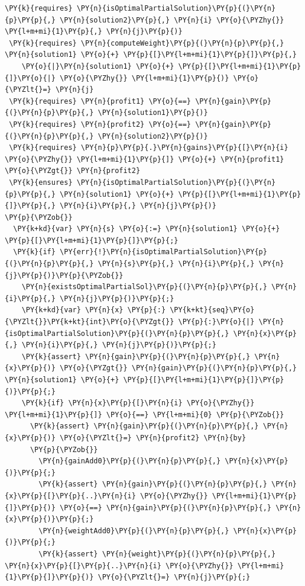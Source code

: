 \begin{sloppypar}
\begin{enumerate}
\begin{Verbatim}[commandchars=\\\{\}]
 \PY{k}{requires} \PY{n}{isOptimalPartialSolution}\PY{p}{(}\PY{n}{p}\PY{p}{,} \PY{n}{solution2}\PY{p}{,} \PY{n}{i} \PY{o}{\PYZhy{}} \PY{l+m+mi}{1}\PY{p}{,} \PY{n}{j}\PY{p}{)}
 \PY{k}{requires} \PY{n}{computeWeight}\PY{p}{(}\PY{n}{p}\PY{p}{,} \PY{n}{solution1} \PY{o}{+} \PY{p}{[}\PY{l+m+mi}{1}\PY{p}{]}\PY{p}{,} 
    \PY{o}{|}\PY{n}{solution1} \PY{o}{+} \PY{p}{[}\PY{l+m+mi}{1}\PY{p}{]}\PY{o}{|} \PY{o}{\PYZhy{}} \PY{l+m+mi}{1}\PY{p}{)} \PY{o}{\PYZlt{}=} \PY{n}{j}
 \PY{k}{requires} \PY{n}{profit1} \PY{o}{==} \PY{n}{gain}\PY{p}{(}\PY{n}{p}\PY{p}{,} \PY{n}{solution1}\PY{p}{)}
 \PY{k}{requires} \PY{n}{profit2} \PY{o}{==} \PY{n}{gain}\PY{p}{(}\PY{n}{p}\PY{p}{,} \PY{n}{solution2}\PY{p}{)}
 \PY{k}{requires} \PY{n}{p}\PY{p}{.}\PY{n}{gains}\PY{p}{[}\PY{n}{i} \PY{o}{\PYZhy{}} \PY{l+m+mi}{1}\PY{p}{]} \PY{o}{+} \PY{n}{profit1} \PY{o}{\PYZgt{}} \PY{n}{profit2}
 \PY{k}{ensures} \PY{n}{isOptimalPartialSolution}\PY{p}{(}\PY{n}{p}\PY{p}{,} \PY{n}{solution1} \PY{o}{+} \PY{p}{[}\PY{l+m+mi}{1}\PY{p}{]}\PY{p}{,} \PY{n}{i}\PY{p}{,} \PY{n}{j}\PY{p}{)}
\PY{p}{\PYZob{}}
  \PY{k+kd}{var} \PY{n}{s} \PY{o}{:=} \PY{n}{solution1} \PY{o}{+} \PY{p}{[}\PY{l+m+mi}{1}\PY{p}{]}\PY{p}{;}
  \PY{k}{if} \PY{err}{!}\PY{n}{isOptimalPartialSolution}\PY{p}{(}\PY{n}{p}\PY{p}{,} \PY{n}{s}\PY{p}{,} \PY{n}{i}\PY{p}{,} \PY{n}{j}\PY{p}{)}\PY{p}{\PYZob{}}
    \PY{n}{existsOptimalPartialSol}\PY{p}{(}\PY{n}{p}\PY{p}{,} \PY{n}{i}\PY{p}{,} \PY{n}{j}\PY{p}{)}\PY{p}{;}
    \PY{k+kd}{var} \PY{n}{x} \PY{p}{:} \PY{k+kt}{seq}\PY{o}{\PYZlt{}}\PY{k+kt}{int}\PY{o}{\PYZgt{}} \PY{p}{:}\PY{o}{|} \PY{n}{isOptimalPartialSolution}\PY{p}{(}\PY{n}{p}\PY{p}{,} \PY{n}{x}\PY{p}{,} \PY{n}{i}\PY{p}{,} \PY{n}{j}\PY{p}{)}\PY{p}{;}
    \PY{k}{assert} \PY{n}{gain}\PY{p}{(}\PY{n}{p}\PY{p}{,} \PY{n}{x}\PY{p}{)} \PY{o}{\PYZgt{}} \PY{n}{gain}\PY{p}{(}\PY{n}{p}\PY{p}{,} \PY{n}{solution1} \PY{o}{+} \PY{p}{[}\PY{l+m+mi}{1}\PY{p}{]}\PY{p}{)}\PY{p}{;}
    \PY{k}{if} \PY{n}{x}\PY{p}{[}\PY{n}{i} \PY{o}{\PYZhy{}} \PY{l+m+mi}{1}\PY{p}{]} \PY{o}{==} \PY{l+m+mi}{0} \PY{p}{\PYZob{}}
      \PY{k}{assert} \PY{n}{gain}\PY{p}{(}\PY{n}{p}\PY{p}{,} \PY{n}{x}\PY{p}{)} \PY{o}{\PYZlt{}=} \PY{n}{profit2} \PY{n}{by} 
      \PY{p}{\PYZob{}}
        \PY{n}{gainAdd0}\PY{p}{(}\PY{n}{p}\PY{p}{,} \PY{n}{x}\PY{p}{)}\PY{p}{;}
        \PY{k}{assert} \PY{n}{gain}\PY{p}{(}\PY{n}{p}\PY{p}{,} \PY{n}{x}\PY{p}{[}\PY{p}{..}\PY{n}{i} \PY{o}{\PYZhy{}} \PY{l+m+mi}{1}\PY{p}{]}\PY{p}{)} \PY{o}{==} \PY{n}{gain}\PY{p}{(}\PY{n}{p}\PY{p}{,} \PY{n}{x}\PY{p}{)}\PY{p}{;}
        \PY{n}{weightAdd0}\PY{p}{(}\PY{n}{p}\PY{p}{,} \PY{n}{x}\PY{p}{)}\PY{p}{;}
        \PY{k}{assert} \PY{n}{weight}\PY{p}{(}\PY{n}{p}\PY{p}{,} \PY{n}{x}\PY{p}{[}\PY{p}{..}\PY{n}{i} \PY{o}{\PYZhy{}} \PY{l+m+mi}{1}\PY{p}{]}\PY{p}{)} \PY{o}{\PYZlt{}=} \PY{n}{j}\PY{p}{;}

\end{Verbatim}
\end{enumerate}
\end{sloppypar}
